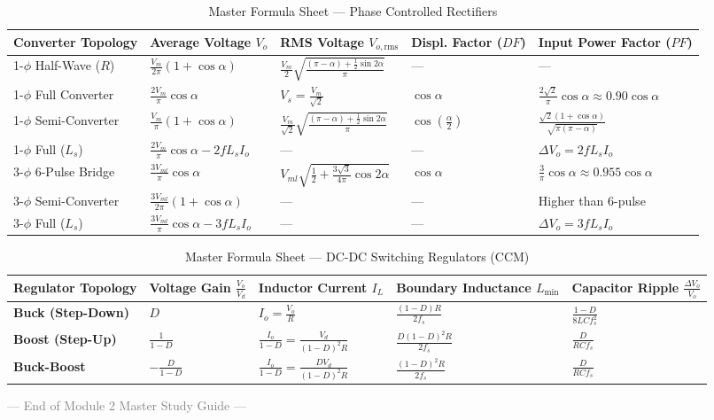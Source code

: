 \documentclass[11pt,a4paper]{article}
\begin{document}
\begin{table}[h!]
\centering
\small
\caption{Master Formula Sheet --- Phase Controlled Rectifiers}
\begin{tabularx}{\textwidth}{p{3.2cm}YYYY}
\toprule
\textbf{Converter Topology} & \textbf{Average Voltage $V_o$} & \textbf{RMS Voltage $V_{o,\text{rms}}$} & \textbf{Displ. Factor ($DF$)} & \textbf{Input Power Factor ($PF$)} \\
-$\phi$ Half-Wave ($R$) & $\frac{V_m}{2\pi}(1+\cos\alpha)$ & $\frac{V_m}{2}\sqrt{\frac{(\pi-\alpha)+\frac{1}{2}\sin 2\alpha}{\pi}}$ & --- & --- \\[1.5ex]
1-$\phi$ Full Converter & $\frac{2 V_m}{\pi}\cos\alpha$ & $V_s = \frac{V_m}{\sqrt{2}}$ & $\cos\alpha$ & $\frac{2\sqrt{2}}{\pi}\cos\alpha \approx 0.90\cos\alpha$ \\[1.5ex]
1-$\phi$ Semi-Converter & $\frac{V_m}{\pi}(1+\cos\alpha)$ & $\frac{V_m}{\sqrt{2}}\sqrt{\frac{(\pi-\alpha)+\frac{1}{2}\sin 2\alpha}{\pi}}$ & $\cos\left(\frac{\alpha}{2}\right)$ & $\frac{\sqrt{2}(1+\cos\alpha)}{\sqrt{\pi(\pi-\alpha)}}$ \\[1.5ex]
1-$\phi$ Full ($L_s$) & $\frac{2 V_m}{\pi}\cos\alpha - 2 f L_s I_o$ & --- & --- & $\Delta V_o = 2 f L_s I_o$ \\[1.5ex]
3-$\phi$ 6-Pulse Bridge & $\frac{3 V_{ml}}{\pi}\cos\alpha$ & $V_{ml}\sqrt{\frac{1}{2}+\frac{3\sqrt{3}}{4\pi}\cos 2\alpha}$ & $\cos\alpha$ & $\frac{3}{\pi}\cos\alpha \approx 0.955\cos\alpha$ \\[1.5ex]
3-$\phi$ Semi-Converter & $\frac{3 V_{ml}}{2\pi}(1+\cos\alpha)$ & --- & --- & Higher than 6-pulse \\[1.5ex]
3-$\phi$ Full ($L_s$) & $\frac{3 V_{ml}}{\pi}\cos\alpha - 3 f L_s I_o$ & --- & --- & $\Delta V_o = 3 f L_s I_o$ \\
\bottomrule
\end{tabularx}
\end{table}

\vspace{1em}

\begin{table}[h!]
\centering
\small
\caption{Master Formula Sheet --- DC-DC Switching Regulators (CCM)}
\begin{tabularx}{\textwidth}{p{3.2cm}YYYY}
\toprule
\textbf{Regulator Topology} & \textbf{Voltage Gain $\frac{V_o}{V_d}$} & \textbf{Inductor Current $I_L$} & \textbf{Boundary Inductance $L_{\min}$} & \textbf{Capacitor Ripple $\frac{\Delta V_o}{V_o}$} \\
\midrule
\textbf{Buck (Step-Down)} & $D$ & $I_o = \frac{V_o}{R}$ & $\frac{(1 - D) R}{2 f_s}$ & $\frac{1 - D}{8 L C f_s^2}$ \\[1.8ex]
\textbf{Boost (Step-Up)} & $\frac{1}{1 - D}$ & $\frac{I_o}{1 - D} = \frac{V_d}{(1 - D)^2 R}$ & $\frac{D (1 - D)^2 R}{2 f_s}$ & $\frac{D}{R C f_s}$ \\[1.8ex]
\textbf{Buck-Boost} & $-\frac{D}{1 - D}$ & $\frac{I_o}{1 - D} = \frac{D V_d}{(1 - D)^2 R}$ & $\frac{(1 - D)^2 R}{2 f_s}$ & $\frac{D}{R C f_s}$ \\
\bottomrule
\end{tabularx}
\end{table}

\vspace{1.5em}
\begin{center}
  \small\textcolor{gray}{--- End of Module 2 Master Study Guide ---}
\end{center}
\end{document}
